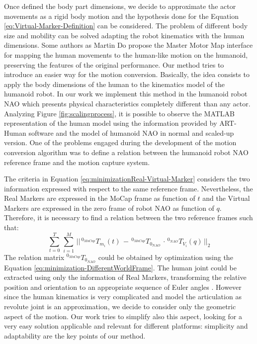\documentclass[a4paper, 10pt, conference]{ieeeconf}
\begin{document}
Once defined the body part dimensions, we decide to approximate the actor movements as a rigid body motion and the hypothesis done for the Equation \eqref{eq:Virtual-Marker-Definition} can be considered.
The problem of different body size and mobility can be solved adapting the robot kinematics with the human dimensions.
Some authors as Martin Do \cite{Do2008} propose the Master
Motor Map interface for mapping the human movements to the human-like motion on the humanoid, preserving the features of the original performance.
Our method tries to introduce an easier way for the motion conversion. Basically, the idea consists to apply the body dimensions of the human to the kinematics model of the humanoid robot. In our work we implement this method in the humanoid robot NAO which presents physical characteristics completely different than any actor.
Analyzing Figure \ref{fig:scalingprocess}, it is possible to observe the MATLAB representation of the human model using the information provided by ART-Human software and the model of humanoid NAO in normal and scaled-up version.
One of the problems engaged during the development of the motion conversion algorithm was to define a relation between the humanoid robot NAO reference frame and the motion capture system.

The criteria in Equation \eqref{eq:minimizationReal-Virtual-Marker} considers the two information expressed with respect to the same reference frame.
Nevertheless, the Real Markers are expressed in the MoCap frame as function of $t$ and the Virtual Markers are expressed in the zero frame of robot NAO as function of $q$.
Therefore, it is necessary to find a relation between the two reference frames such that:
\begin{equation}
\sum^{T}_{t=0} \, \sum^{M}_{i=1} \, || \, ^{0_{MoCap}}T_{m_i}(t) \, - \, ^{0_{MoCap}}T_{0_{NAO}} \, \cdot \, ^{0_{NAO}}T_{V_i}(q) \, ||_2
\label{eq:minimization-DifferentWorldFrame}
\end{equation}
The relation matrix $^{0_{MoCap}}T_{0_{NAO}}$ could be obtained by optimization using the Equation \eqref{eq:minimization-DifferentWorldFrame}. The human joint could be extracted using only the information of Real Markers, transforming the relative position and orientation to an appropriate sequence of Euler angles \cite{Shoemake1994}. However since the human kinematics is very complicated and model the articulation as revolute joint is an approximation, we decide to consider only the geometric aspect of the motion. 
Our work tries to simplify also this aspect, looking for a very easy solution applicable and relevant for different platforms: simplicity and adaptability are the key points of our method.
\end{document}
